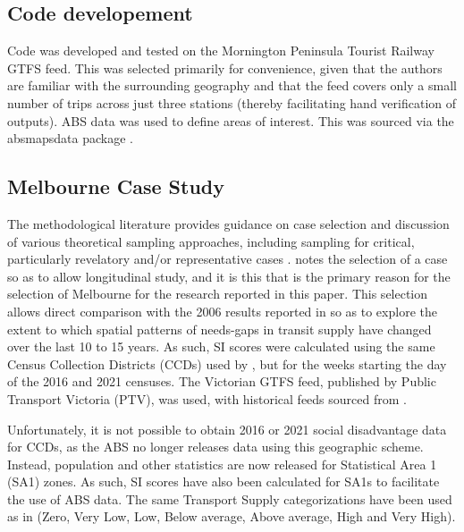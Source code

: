 \documentclass[preprint, 3p,
authoryear]{elsarticle} %
\begin{document}
\subsection{Code developement}\label{code-developement}

Code was developed and tested on the Mornington Peninsula Tourist
Railway GTFS feed. This was selected primarily for convenience, given
that the authors are familiar with the surrounding geography and that
the feed covers only a small number of trips across just three stations
(thereby facilitating hand verification of outputs). ABS data was used
to define areas of interest. This was sourced via the absmapsdata
package \citep{absmapsdata}.

\subsection{Melbourne Case Study}\label{melbourne-case-study}

The methodological literature provides guidance on case selection and
discussion of various theoretical sampling approaches, including
sampling for critical, particularly revelatory and/or representative
cases
\citep{Eisenhardt1989aa, Yin2009aa, Denscombe2007aa, Eisenhardt2007TBfC}.
\citet{Yin2009aa} notes the selection of a case so as to allow
longitudinal study, and it is this that is the primary reason for the
selection of Melbourne for the research reported in this paper. This
selection allows direct comparison with the 2006 results reported in
\citet{currie2010identifying} so as to explore the extent to which
spatial patterns of needs-gaps in transit supply have changed over the
last 10 to 15 years. As such, SI scores were calculated using the same
Census Collection Districts (CCDs) used by
\citet{currie2010identifying}, but for the weeks starting the day of the
2016 and 2021 censuses. The Victorian GTFS feed, published by Public
Transport Victoria (PTV), was used, with historical feeds sourced from
\citet{transitfeeds_victoria:2023aa}.

Unfortunately, it is not possible to obtain 2016 or 2021 social
disadvantage data for CCDs, as the ABS no longer releases data using
this geographic scheme. Instead, population and other statistics are now
released for Statistical Area 1 (SA1) zones. As such, SI scores have
also been calculated for SA1s to facilitate the use of ABS data. The
same Transport Supply categorizations have been used as in
\citet{currie2010identifying} (Zero, Very Low, Low, Below average, Above
average, High and Very High).
\end{document}
